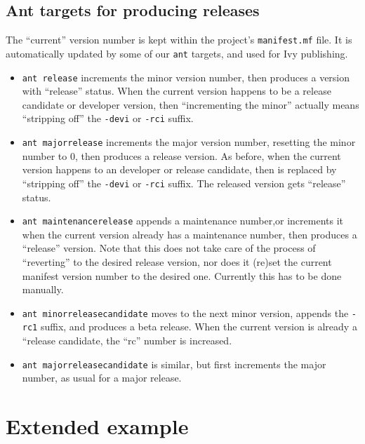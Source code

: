 


\subsection{Ant targets for producing releases}

The ``current'' version number is kept within the project's \verb"manifest.mf" file.
It is automatically updated by some of our \verb"ant" targets, and used for Ivy publishing.

\begin{itemize}
\item \verb"ant release"  increments the minor version number, then produces a  version with ``release'' status.
When the current version happens to be a release candidate or developer version, then ``incrementing the minor''
actually means ``stripping off'' the \verb"-devi" or \verb"-rci" suffix.
\item \verb"ant majorrelease"  increments the major version number, resetting the minor number to $0$, then produces a release version. As before, when the current version happens to an developer or release candidate, then is replaced by
    ``stripping off'' the \verb"-devi" or \verb"-rci" suffix. The released version gets ``release'' status.

\item \verb"ant maintenancerelease" appends a maintenance number,or increments it when the current version already has
a maintenance number, then produces a ``release'' version. Note that this does not take care of the process of ``reverting'' to the desired release version, 
nor does it (re)set the current manifest version number to the desired one.
Currently this has to be done manually.

\item \verb"ant minorreleasecandidate" moves to the next minor version, appends the \verb"-rc1" suffix, and
produces a beta release. When the current version is already a ``release candidate, the ``rc'' number is increased.

\item \verb"ant majorreleasecandidate" is similar, but first increments the major number, as usual for a major release.
\end{itemize}




\section{Extended example}

